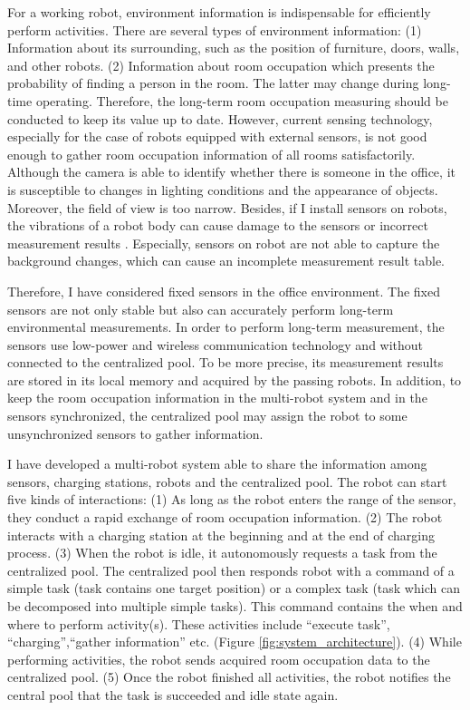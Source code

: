 For a working robot, environment information is indispensable for efficiently perform activities. There are several types of environment information: (1) Information about its surrounding, such as the position of furniture, doors, walls, and other robots. (2) Information about room occupation which presents the probability of finding a person in the room. The latter may change during long-time operating. Therefore, the long-term room occupation measuring should be conducted to keep its value up to date.
However, current sensing technology, especially for the case of robots equipped with external sensors, is not good enough to gather room occupation information of all rooms satisfactorily. 
Although the camera is able to identify whether there is someone in the office, it is susceptible to changes in lighting conditions and the appearance of objects. Moreover, the field of view is too narrow. Besides, if I install sensors on robots, the vibrations of a robot body can cause damage to the sensors or incorrect measurement results \cite{PYO2015148}. Especially, sensors on robot are not able to capture the background changes, which can cause an incomplete measurement result table.

Therefore, I have considered fixed sensors in the office environment. The fixed sensors are not only stable but also can accurately perform long-term environmental measurements. In order to perform long-term measurement, the sensors use low-power and wireless communication technology and without connected to the centralized pool. To be more precise, its measurement results are stored in its local memory and acquired by the passing robots. In addition, to keep the room occupation information in the multi-robot system and in the sensors synchronized, the centralized pool may assign the robot to some unsynchronized sensors to gather information.

I have developed a multi-robot system able to share the information among sensors, charging stations, robots and the centralized pool. The robot can start five kinds of interactions: 
(1) As long as the robot enters the range of the sensor, they conduct a rapid exchange of room occupation information. 
(2) The robot interacts with a charging station at the beginning and at the end of charging process. 
(3) When the robot is idle, it autonomously requests a task from the centralized pool. The centralized pool then responds robot with a command of a simple task (task contains one target position) or a complex task (task which can be decomposed into multiple simple tasks). This command contains the when and where to perform activity(s). These activities include ``execute task'', ``charging'',``gather information'' etc. (Figure \ref{fig:system_architecture}).
(4) While performing activities, the robot sends acquired room occupation data to the centralized pool. 
(5) Once the robot finished all activities, the robot notifies the central pool that the task is succeeded and idle state again.


